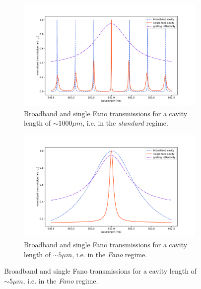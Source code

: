 \begin{figure}[h!]
    \centering
    \begin{subfigure}[b]{0.49\textwidth}
        \includegraphics[width=\textwidth]{figures/fano_and_broadband_cavity_1000um.pdf}
        \caption{Broadband and single Fano transmissions for a cavity length of $\sim 1000 \mu m$, i.e. in the \emph{standard} regime.}
        \label{fig:standard_regime_trans}
    \end{subfigure}
    \begin{subfigure}[b]{0.49\textwidth}
        \includegraphics[width=\textwidth]{figures/fano_and_broadband_cavity_5um.pdf}
        \caption{Broadband and single Fano transmissions for a cavity length of $\sim 5 \mu m$, i.e. in the \emph{Fano} regime.}
        \label{fig:fano_regime_trans}
    \end{subfigure}
\end{figure}

